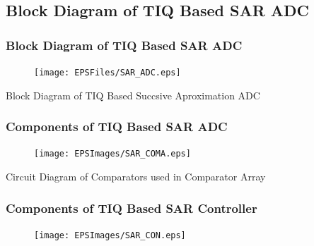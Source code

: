 \subsection*{Block Diagram of TIQ Based SAR ADC }
\begin{frame}
	\frametitle{Block Diagram of TIQ Based SAR ADC}
	\begin{center}
		\begin{figure}
		\texttt{[image: EPSFiles/SAR\_ADC.eps]}\\
		\end{figure}
	\small{Block Diagram of TIQ Based Succsive Aproximation ADC}
	\end{center}
\end{frame}
\begin{frame}
	\frametitle{Components of TIQ Based SAR ADC}
	\begin{center}
		\begin{figure}
		\texttt{[image: EPSImages/SAR\_COMA.eps]}\\
		\end{figure}
	\small{Circuit Diagram of Comparators used in Comparator Array}
	\end{center}
\end{frame}
\begin{frame}
	\frametitle{Components of TIQ Based SAR Controller}
	\begin{center}
		\begin{figure}
		\texttt{[image: EPSImages/SAR\_CON.eps]}\\
		\end{figure}
	\end{center}
\end{frame}
